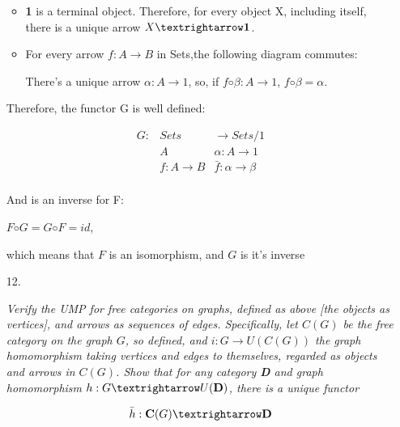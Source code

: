 \documentclass{article}
\begin{document}
\begin{enumerate}
    \begin{itemize}
      \item {\bf 1} is a terminal object. Therefore, for every object X,
        including itself, there is a unique arrow $X → \text{\bf 1}$.
      \item For every arrow $f : A → B$ in Sets,the following diagram
        commutes:
        

     There's a unique arrow $α : A → 1$, so, if $f ◦ β : A → 1$,
     $f ◦ β = α$.

    \end{itemize}

    Therefore, the functor G is well defined:

    \begin{equation*}
    \begin{array}{rll}
      G : & Sets             & → Sets/1         \\
          & A                & α : A → 1  \\
          & f : A → B        & \bar{f} : α → β\\
    \end{array}
    \end{equation*}

    And is an inverse for F:

    $F ◦ G = G ◦ F = id$,

    which means that $F$ is an isomorphism, and $G$ is it's inverse
    
  \item[12.]

{\em
Verify the UMP for free categories on graphs, defined as above [the objects as
vertices], and arrows as sequences of edges. Specifically, let $C(G)$ be the free category on the
graph $G$, so defined, and $i : G → U (C(G))$ the graph homomorphism taking
vertices and edges to themselves, regarded as objects and arrows in $C(G)$.
Show that for any category {\bf D} and graph homomorphism $h : G → U (\text{\bf D})$,
there is a unique functor

$$\bar{h} : \text{\bf C}(G) → \text{\bf D}$$

}
\end{enumerate}
\end{document}
